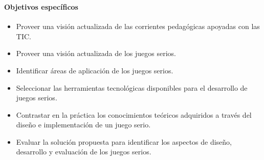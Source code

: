 \begin{frame}
\frametitle{\pagetitle}
\framesubtitle{Objetivos específicos}

\small
\begin{itemize}[<+->]
\item Proveer una visión actualizada de las corrientes pedagógicas apoyadas con las TIC.
\item Proveer una visión actualizada de los juegos serios.
\item Identificar áreas de aplicación de los juegos serios.
\item Seleccionar las herramientas tecnológicas disponibles para el desarrollo de juegos serios.
\item Contrastar en la práctica los conocimientos teóricos adquiridos a través del diseño
e implementación de un juego serio.
\item Evaluar la solución propuesta para identificar los
aspectos de diseño, desarrollo y evaluación de los juegos serios.
\end{itemize}
\end{frame}

